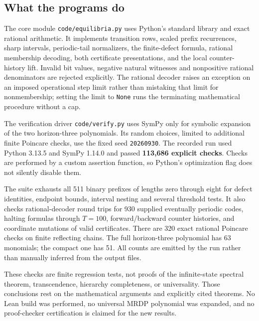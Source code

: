 \documentclass[11pt,letterpaper]{article}
\numberwithin{equation}{section}
\theoremstyle{definition}
\theoremstyle{remark}
\newcommand{\code}[1]{\nolinkurl{#1}}
\begin{document}
\subsection{What the programs do}
The core module \code{code/equilibria.py} uses Python's standard
library and exact rational arithmetic. It implements transition
rows, scaled prefix recurrences, sharp intervals, periodic-tail
normalizers, the finite-defect formula, rational membership decoding,
both certificate presentations, and the local counter-history lift.
Invalid bit values, negative natural witnesses and nonpositive
rational denominators are rejected explicitly. The rational decoder
raises an exception on an imposed operational step limit rather than
mistaking that limit for nonmembership; setting the limit to
\code{None} runs the terminating mathematical procedure without a cap.

The verification driver \code{code/verify.py} uses SymPy only for
symbolic expansion of the two horizon-three polynomials. Its random
choices, limited to additional finite Poincare checks, use the fixed
seed \code{20260930}. The recorded run used Python 3.13.5 and
SymPy 1.14.0 and passed \textbf{113,686 explicit checks}. Checks are
performed by a custom assertion function, so Python's optimization
flag does not silently disable them.

The suite exhausts all 511 binary prefixes of lengths zero through
eight for defect identities, endpoint bounds, interval nesting and
several threshold tests. It also checks rational-decoder round trips
for 930 supplied eventually periodic codes, halting formulas through
$T=100$, forward/backward counter histories, and coordinate mutations
of valid certificates. There are 320 exact rational Poincare checks
on finite reflecting chains. The full horizon-three polynomial has
63 monomials; the compact one has 51. All counts are emitted by the
run rather than manually inferred from the output files.

These checks are finite regression tests, not proofs of the
infinite-state spectral theorem, transcendence, hierarchy completeness,
or universality. Those conclusions rest on the mathematical arguments
and explicitly cited theorems. No Lean build was performed, no universal
MRDP polynomial was expanded, and no proof-checker certification is
claimed for the new results.
\end{document}
